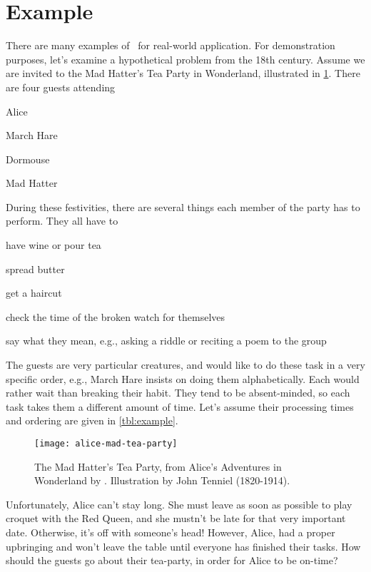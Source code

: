 \section{Example}\label{sec:jsp:example}
There are many examples of \jsp\ for real-world application. 
For demonstration purposes, let's examine a hypothetical problem from 
the 18th century. Assume we are invited to the Mad Hatter's Tea Party in 
Wonderland, illustrated in \cref{fig:teaparty}. 
There are four guests attending
\begin{enumerate*}[label={$J_\arabic*$)}, ref={{$J_\arabic*$}}, 
    itemjoin*={{, and of course our host }}]
    \item Alice\label{guest:alice}
    \item March Hare\label{guest:marchhare}
    \item Dormouse\label{guest:dormouse}
    \item Mad Hatter\label{guest:madhatter}
\end{enumerate*}
During these festivities, there are several things each member of the party 
has to perform. They all have to
\begin{enumerate*}[label={$M_\arabic*$)}]
    \item have wine or pour tea
    \item spread butter
    \item get a haircut
    \item check the time of the broken watch for themselves
    \item say what they mean, e.g., asking a riddle  or reciting a poem to the 
    group
\end{enumerate*}
The guests are very particular creatures, and would like to do these task in a 
very specific order, e.g., March Hare insists on doing 
them alphabetically. Each would rather wait than breaking their habit.
They tend to be absent-minded, so each task takes them a different amount of 
time. 
Let's assume their processing times and ordering are given in 
\cref{tbl:example}. 
\clearpage

\begin{figure}[b!]\centering 
    \texttt{[image: alice-mad-tea-party]}
    \caption{The Mad Hatter's Tea Party, from Alice's Adventures in Wonderland 
        by \citet{alice}. Illustration by John Tenniel 
        (1820-1914).}\label{fig:teaparty}
\end{figure}



Unfortunately, Alice can't stay long. She must leave as soon as possible to 
play croquet with the Red Queen, 
and she mustn't be late for that very important date. Otherwise, it's off with 
someone's head! However, Alice, had a proper upbringing and won't leave the 
table until everyone has finished their tasks. 
How should the guests go about their tea-party, in order for Alice to be 
on-time?


